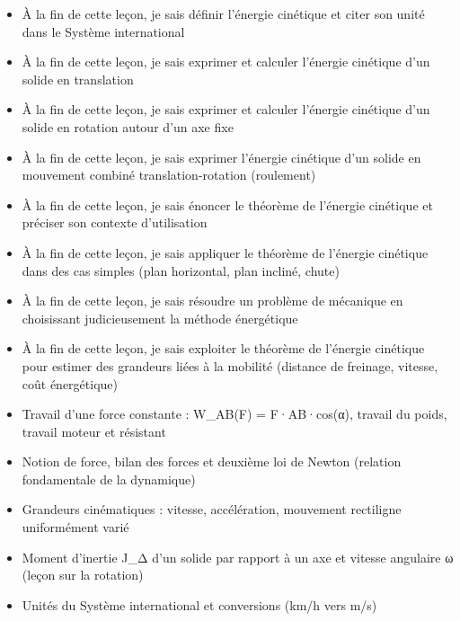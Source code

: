 \documentclass[11pt]{article}
\begin{document}
\begin{objectifs}
\begin{itemize}
\item À la fin de cette leçon, je sais définir l'énergie cinétique et citer son unité dans le Système international
\item À la fin de cette leçon, je sais exprimer et calculer l'énergie cinétique d'un solide en translation
\item À la fin de cette leçon, je sais exprimer et calculer l'énergie cinétique d'un solide en rotation autour d'un axe fixe
\item À la fin de cette leçon, je sais exprimer l'énergie cinétique d'un solide en mouvement combiné translation-rotation (roulement)
\item À la fin de cette leçon, je sais énoncer le théorème de l'énergie cinétique et préciser son contexte d'utilisation
\item À la fin de cette leçon, je sais appliquer le théorème de l'énergie cinétique dans des cas simples (plan horizontal, plan incliné, chute)
\item À la fin de cette leçon, je sais résoudre un problème de mécanique en choisissant judicieusement la méthode énergétique
\item À la fin de cette leçon, je sais exploiter le théorème de l'énergie cinétique pour estimer des grandeurs liées à la mobilité (distance de freinage, vitesse, coût énergétique)
\end{itemize}
\end{objectifs}

\begin{prerequis}
\begin{itemize}
\item Travail d'une force constante : W\_AB(F) = F·AB·cos(α), travail du poids, travail moteur et résistant
\item Notion de force, bilan des forces et deuxième loi de Newton (relation fondamentale de la dynamique)
\item Grandeurs cinématiques : vitesse, accélération, mouvement rectiligne uniformément varié
\item Moment d'inertie J\_Δ d'un solide par rapport à un axe et vitesse angulaire ω (leçon sur la rotation)
\item Unités du Système international et conversions (km/h vers m/s)
\end{itemize}
\end{prerequis}

\newpage
\end{document}
